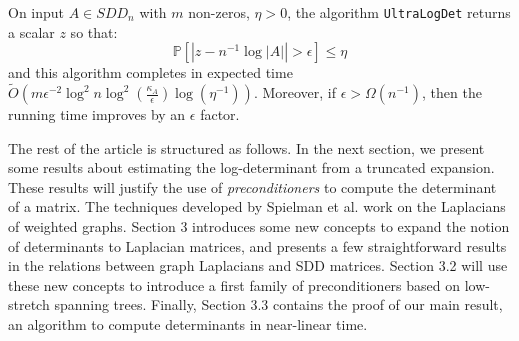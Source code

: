 \begin{theorem}\label{thm:ultra_main}On input $A\in SDD_{n}$ with
$m$ non-zeros, $\eta>0$, the algorithm \texttt{UltraLogDet} returns
a scalar $z$ so that: 
\[
\mathbb{P}\left[\left|z-n^{-1}\log\left|A\right|\right|>\epsilon\right]\leq\eta
\]
and this algorithm completes in expected time $\tilde{O}\left(m\epsilon^{-2}\log^{2}n\log^{2}\left(\frac{\kappa_{A}}{\epsilon}\right)\log\left(\eta^{-1}\right)\right)$.
Moreover, if $\epsilon>\Omega(n^{-1})$, then the running time improves
by an $\epsilon$ factor.

\end{theorem}

The rest of the article is structured as follows. In the next section,
we present some results about estimating the log-determinant from
a truncated expansion. These results will justify the use of \emph{preconditioners
}to compute the determinant of a matrix. The techniques developed
by Spielman et al. work on the Laplacians of weighted graphs. Section
3 introduces some new concepts to expand the notion of determinants
to Laplacian matrices, and presents a few straightforward results
in the relations between graph Laplacians and SDD matrices. Section
3.2 will use these new concepts to introduce a first family of preconditioners
based on low-stretch spanning trees. Finally, Section 3.3 contains
the proof of our main result, an algorithm to compute determinants
in near-linear time. 
